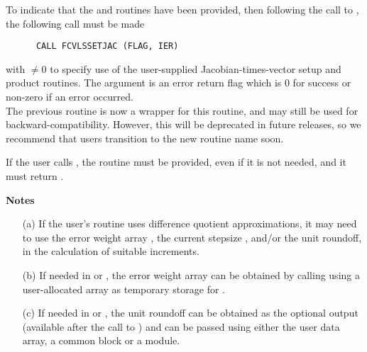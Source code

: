 \begin{Steps}
  To indicate that the  and  routines
  have been provided, then following the call to , the
  following call must be made
\begin{verbatim}
      CALL FCVLSSETJAC (FLAG, IER)
\end{verbatim}
  with  $\neq 0$ to specify use of the user-supplied
  Jacobian-times-vector setup and product routines.
  The argument  is an error return flag which is $0$ 
  for success or non-zero if an error occurred.\\

  The previous routine  is now a wrapper for this
  routine, and may still be used for backward-compatibility.  However,
  this will be deprecated in future releases, so we recommend that
  users transition to the new routine name soon.
  
  {\warn}If the user calls , the routine
   must be provided, even if it is not needed, and it
  must return .

  {\bf Notes} 
  \begin{itemize}
  \item[(a) ] If the user's  routine uses difference
    quotient approximations, it may need to use the error weight array ,
    the current stepsize , and/or the unit roundoff, in the calculation of
    suitable increments.  
  \item[(b) ] If needed in  or , the
    error weight array  can be obtained by calling
     using a user-allocated array as temporary
    storage for .
  \item[(c) ] If needed in  or , the unit
    roundoff can be obtained as the optional output 
    (available after the call to ) and can be passed
    using either the  user data array, a common block or a
    module.
  \end{itemize}
  
 



\end{Steps}
